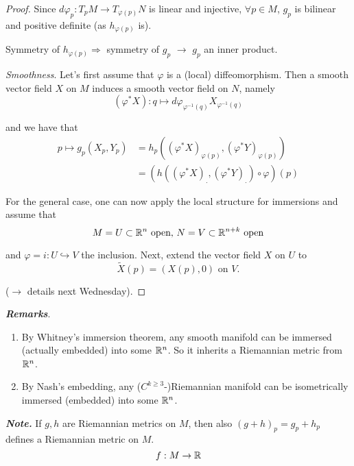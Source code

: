 \documentclass{article}
\begin{document}
\begin{proof}
  Since $d\varphi_p:T_pM \rightarrow T_{\varphi(p)}N$ is linear and injective, $\forall p \in M$, $g_p$ is bilinear and positive definite (as $h_{\varphi(p)}$ is).

  Symmetry of $h_{\varphi(p)} \Rightarrow$  symmetry of $g_p$ $\rightarrow$ $g_p$ an inner product.

  \textit{Smoothness}. Let's first assume that $\varphi$ is a (local) diffeomorphism. Then a smooth vector field $X$ on $M$ induces a smooth vector field on $N$, namely
  \begin{equation}
    (\varphi^{*}X): q \mapsto d\varphi_{\varphi^{-1}(q)}X_{\varphi^{-1}(q)}
  \end{equation}

  and we have that
  \begin{align}
    p \mapsto g_p(X_p, Y_p) &= h_p ((\varphi^{*}X)_{\varphi(p)}, (\varphi^{*}Y)_{\varphi(p)}) \\
    &= (h ( ( \varphi^{*}X)_{.}, (\varphi^{*}Y)_{.}) \circ \varphi)(p)
  \end{align}

  For the general case, one can now apply the local structure for immersions and assume that
  \begin{equation}
    M = U \subset \mathbb{R}^n \text{ open, } N = V \subset \mathbb{R}^{n+k} \text{ open}
  \end{equation}

  and $\varphi = i : U \hookrightarrow V$ the inclusion. Next, extend the vector field $X$ on $U$ to
  \begin{equation}
    \tilde{X} (p) = (X(p), 0) \text{ on } V.
  \end{equation}

  ($\rightarrow$ details next Wednesday).
\end{proof}

\textbf{\textit{Remarks}}.
\begin{enumerate}
\item By Whitney's immersion theorem, any smooth manifold can be immersed (actually embedded) into some $\mathbb{R}^n$. So it inherits a Riemannian metric from $\mathbb{R}^n$.
\item By Nash's embedding, any ($C^{k \geq 3}$-)Riemannian manifold can be isometrically immersed (embedded) into some $\mathbb{R}^n$.
\end{enumerate}

\textbf{\textit{Note.}} If $g, h$ are Riemannian metrics on $M$, then also $(g+h)_p = g_p + h_p$ defines a Riemannian metric on $M$.
\begin{equation}
  f : M \rightarrow \mathbb{R}
\end{equation}
\end{document}
